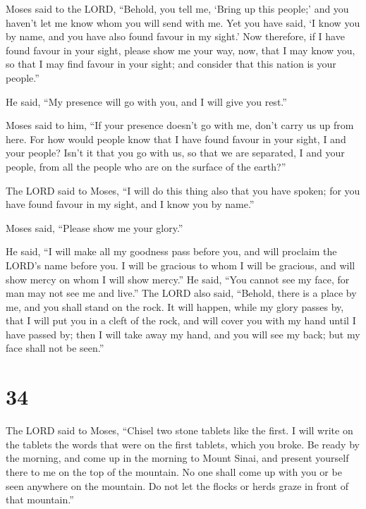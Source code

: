  Moses said to the LORD, ``Behold, you tell me, `Bring up
this people;' and you haven't let me know whom you will send with me.
Yet you have said, `I know you by name, and you have also found favour
in my sight.'  Now therefore, if I have found favour in
your sight, please show me your way, now, that I may know you, so that I
may find favour in your sight; and consider that this nation is your
people.''

 He said, ``My presence will go with you, and I will give
you rest.''

 Moses said to him, ``If your presence doesn't go with me,
don't carry us up from here.  For how would people know
that I have found favour in your sight, I and your people? Isn't it that
you go with us, so that we are separated, I and your people, from all
the people who are on the surface of the earth?''

 The LORD said to Moses, ``I will do this thing also that
you have spoken; for you have found favour in my sight, and I know you
by name.''

 Moses said, ``Please show me your glory.''

 He said, ``I will make all my goodness pass before you,
and will proclaim the LORD's name before you. I will be gracious to whom
I will be gracious, and will show mercy on whom I will show mercy.''
 He said, ``You cannot see my face, for man may not see me
and live.''  The LORD also said, ``Behold, there is a place
by me, and you shall stand on the rock.  It will happen,
while my glory passes by, that I will put you in a cleft of the rock,
and will cover you with my hand until I have passed by; 
then I will take away my hand, and you will see my back; but my face
shall not be seen.''

\hypertarget{section-33}{%
\section{34}\label{section-33}}

 The LORD said to Moses, ``Chisel two stone tablets like the
first. I will write on the tablets the words that were on the first
tablets, which you broke.  Be ready by the morning, and come
up in the morning to Mount Sinai, and present yourself there to me on
the top of the mountain.  No one shall come up with you or
be seen anywhere on the mountain. Do not let the flocks or herds graze
in front of that mountain.''

